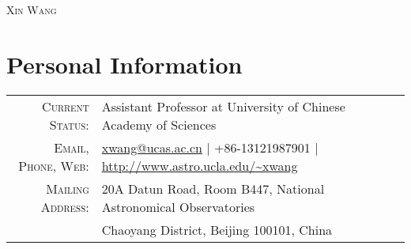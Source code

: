 \documentclass[letterpaper,10pt]{article}
\begin{document}
\par{\centering
  {\LARGE \textsc{Xin Wang}}
\par}

\section{Personal Information}
\vspace*{1ex}
\begin{tabular}{rl}
    \textsc{Current Status:}  & Assistant Professor at University of Chinese Academy of Sciences    \\
    \textsc{Email, Phone, Web:}  & \href{mailto:xwang@ucas.ac.cn}{xwang@ucas.ac.cn}  |  +86-13121987901  |  \url{http://www.astro.ucla.edu/~xwang}\\
    \textsc{Mailing Address:} & 20A Datun Road, Room B447, National Astronomical Observatories  \\
                              & Chaoyang District, Beijing 100101, China    \\
\end{tabular}


\end{document}
